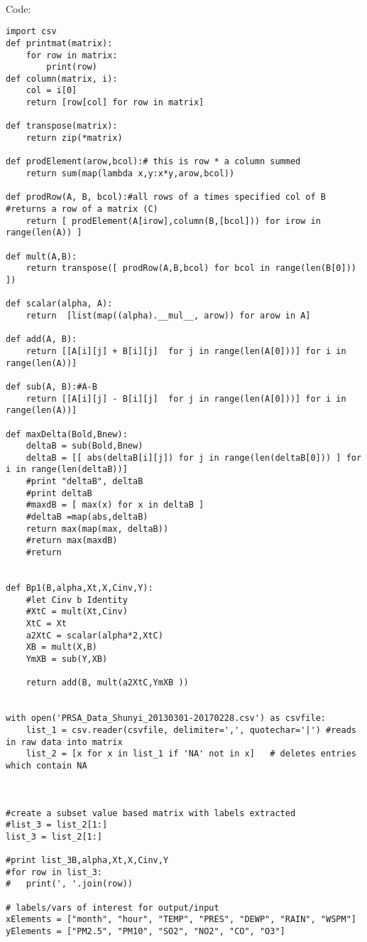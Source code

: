\documentclass[11pt,a4paper]{article}
\begin{document}
 \quad \quad \\
Code:
\scriptsize
\begin{verbatim}
import csv
def printmat(matrix):
	for row in matrix:
		print(row)
def column(matrix, i):
	col = i[0]
	return [row[col] for row in matrix]

def transpose(matrix):
	return zip(*matrix) 
		
def prodElement(arow,bcol):# this is row * a column summed 
	return sum(map(lambda x,y:x*y,arow,bcol))
	
def prodRow(A, B, bcol):#all rows of a times specified col of B #returns a row of a matrix (C)
	return [ prodElement(A[irow],column(B,[bcol])) for irow in range(len(A)) ]
		
def mult(A,B):
	return transpose([ prodRow(A,B,bcol) for bcol in range(len(B[0])) ])  	

def scalar(alpha, A):
	return  [list(map((alpha).__mul__, arow)) for arow in A]

def add(A, B):
	return [[A[i][j] + B[i][j]  for j in range(len(A[0]))] for i in range(len(A))] 

def sub(A, B):#A-B
	return [[A[i][j] - B[i][j]  for j in range(len(A[0]))] for i in range(len(A))]

def maxDelta(Bold,Bnew):
	deltaB = sub(Bold,Bnew)
	deltaB = [[ abs(deltaB[i][j]) for j in range(len(deltaB[0])) ] for i in range(len(deltaB))]
	#print "deltaB", deltaB
	#print deltaB 
	#maxdB = [ max(x) for x in deltaB ]
	#deltaB =map(abs,deltaB)	
	return max(map(max, deltaB))
	#return max(maxdB)
	#return


def Bp1(B,alpha,Xt,X,Cinv,Y):
	#let Cinv b Identity
	#XtC = mult(Xt,Cinv)
	XtC = Xt
	a2XtC = scalar(alpha*2,XtC)
	XB = mult(X,B)
	YmXB = sub(Y,XB)

	return add(B, mult(a2XtC,YmXB ))
	

with open('PRSA_Data_Shunyi_20130301-20170228.csv') as csvfile:
	list_1 = csv.reader(csvfile, delimiter=',', quotechar='|') #reads in raw data into matrix
	list_2 = [x for x in list_1 if 'NA' not in x] 	# deletes entries which contain NA



#create a subset value based matrix with labels extracted
#list_3 = list_2[1:]
list_3 = list_2[1:]
	
#print list_3B,alpha,Xt,X,Cinv,Y
#for row in list_3:
#	print(', '.join(row))

# labels/vars of interest for output/input
xElements = ["month", "hour", "TEMP", "PRES", "DEWP", "RAIN", "WSPM"] 
yElements = ["PM2.5", "PM10", "SO2", "NO2", "CO", "O3"]




\end{verbatim}
\end{document}
